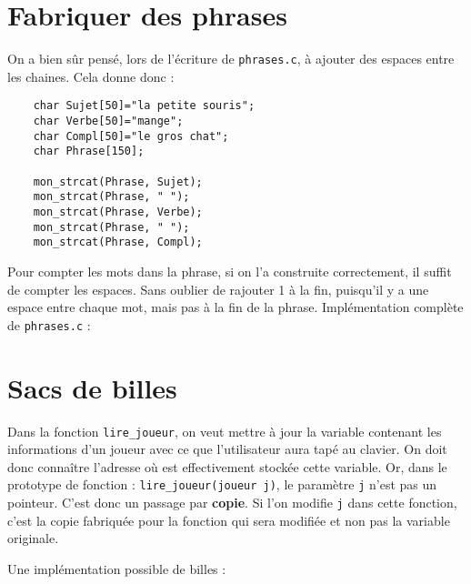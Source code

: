 \documentclass[10pt]{article}
\begin{document}
\section{Fabriquer des phrases}

\begin{enumerate}[label=\textbf{[\alph*]},resume]
  \setlength\itemsep{1em}

\item On a bien sûr pensé, lors de l'écriture de \texttt{phrases.c}, à
  ajouter des espaces entre les chaines. Cela donne donc :

  \begin{lstlisting}
	char Sujet[50]="la petite souris";
	char Verbe[50]="mange";
	char Compl[50]="le gros chat";
	char Phrase[150];

	mon_strcat(Phrase, Sujet);
	mon_strcat(Phrase, " ");
	mon_strcat(Phrase, Verbe);
	mon_strcat(Phrase, " ");
	mon_strcat(Phrase, Compl);
  \end{lstlisting}

\item Pour compter les mots dans la phrase, si on l'a construite
  correctement, il suffit de compter les espaces. Sans oublier de
  rajouter 1 à la fin, puisqu'il y a une espace entre chaque mot, mais
  pas à la fin de la phrase. Implémentation complète de
  \texttt{phrases.c} :

  \vspace{0.5cm}

  

\end{enumerate}

\section{Sacs de billes}


\begin{enumerate}[label=\textbf{[\alph*]},resume]
  \setlength\itemsep{1em}

\item Dans la fonction \texttt{lire\_joueur}, on veut mettre à jour la
  variable contenant les informations d'un joueur avec ce que
  l'utilisateur aura tapé au clavier. On doit donc connaître l'adresse
  où est effectivement stockée cette variable. Or, dans le prototype
  de fonction : \texttt{lire\_joueur(joueur j)}, le paramètre
  \texttt{j} n'est pas un pointeur. C'est donc un passage par
  \textbf{copie}. Si l'on modifie \texttt{j} dans cette fonction,
  c'est la copie fabriquée pour la fonction qui sera modifiée et non
  pas la variable originale.

\item Une implémentation possible de billes :

\vspace{0.5cm}

  

\end{enumerate}
\end{document}
